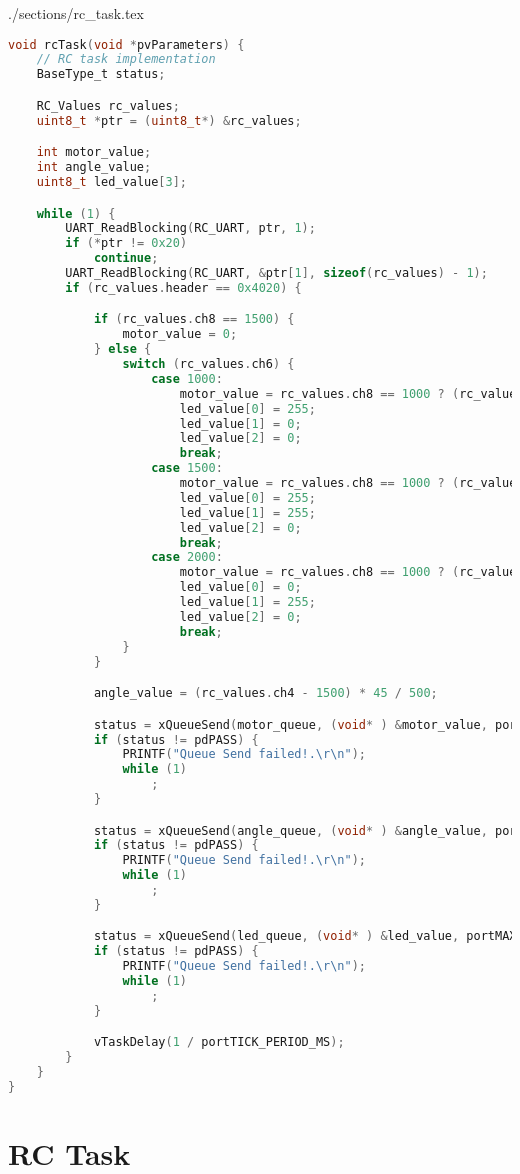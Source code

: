 \begin{filecontents}[overwrite]{./sections/rc_task.tex}
\begin{lstlisting}[language=c,caption=RC Task, label=list:rc]
void rcTask(void *pvParameters) {
    // RC task implementation
    BaseType_t status;

    RC_Values rc_values;
    uint8_t *ptr = (uint8_t*) &rc_values;

    int motor_value;
    int angle_value;
    uint8_t led_value[3];

    while (1) {
        UART_ReadBlocking(RC_UART, ptr, 1);
        if (*ptr != 0x20)
            continue;
        UART_ReadBlocking(RC_UART, &ptr[1], sizeof(rc_values) - 1);
        if (rc_values.header == 0x4020) {

            if (rc_values.ch8 == 1500) {
                motor_value = 0;
            } else {
                switch (rc_values.ch6) {
                    case 1000:
                        motor_value = rc_values.ch8 == 1000 ? (rc_values.ch2 - 1000) / 50 : (rc_values.ch2 - 1000) / -50;
                        led_value[0] = 255;
                        led_value[1] = 0;
                        led_value[2] = 0;
                        break;
                    case 1500:
                        motor_value = rc_values.ch8 == 1000 ? (rc_values.ch2 - 1000) / 20 : (rc_values.ch2 - 1000) / -20;
                        led_value[0] = 255;
                        led_value[1] = 255;
                        led_value[2] = 0;
                        break;
                    case 2000:
                        motor_value = rc_values.ch8 == 1000 ? (rc_values.ch2 - 1000) / 10 : (rc_values.ch2 - 1000) / -10;
                        led_value[0] = 0;
                        led_value[1] = 255;
                        led_value[2] = 0;
                        break;
                }
            }

            angle_value = (rc_values.ch4 - 1500) * 45 / 500;

            status = xQueueSend(motor_queue, (void* ) &motor_value, portMAX_DELAY);
            if (status != pdPASS) {
                PRINTF("Queue Send failed!.\r\n");
                while (1)
                    ;
            }

            status = xQueueSend(angle_queue, (void* ) &angle_value, portMAX_DELAY);
            if (status != pdPASS) {
                PRINTF("Queue Send failed!.\r\n");
                while (1)
                    ;
            }

            status = xQueueSend(led_queue, (void* ) &led_value, portMAX_DELAY);
            if (status != pdPASS) {
                PRINTF("Queue Send failed!.\r\n");
                while (1)
                    ;
            }

            vTaskDelay(1 / portTICK_PERIOD_MS);
        }
    }
}
\end{lstlisting}
\end{filecontents}

\section*{RC Task}

